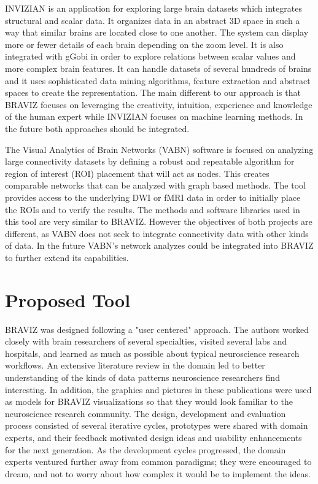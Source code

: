 \documentclass[utf8]{frontiersSCNS} %
\begin{document}
INVIZIAN\citep{bowman_query-based_2011,bowman_feature-similarity_2012} is an application for exploring large brain datasets which integrates structural and scalar data. It organizes data in an abstract 3D space in such a way that similar brains are located close to one another. The system can display more or fewer details of each brain depending on the zoom level. It is also integrated with gGobi\citep{cook_interactive_2007} in order to explore relations between scalar values and more complex brain features. It can handle datasets of several hundreds of brains and it uses sophisticated data mining algorithms, feature extraction and abstract spaces to create the representation. The main different to our approach is that BRAVIZ focuses on leveraging the creativity, intuition, experience and knowledge of the human expert while INVIZIAN focuses on machine learning methods. In the future both approaches should be integrated.

The Visual Analytics of Brain Networks\citep{li_visual_2012} (VABN) software is focused on analyzing large connectivity datasets by defining a robust and repeatable algorithm for region of interest (ROI) placement that will act as nodes. This creates comparable networks that can be analyzed with graph based methods. The tool provides access to the underlying DWI or fMRI data in order to initially place the ROIs and to verify the results. The methods and software libraries used in this tool are very similar to BRAVIZ. However the objectives of both projects are different, as VABN does not seek to integrate connectivity data with other kinds of data. In the future VABN’s network analyzes could be integrated into BRAVIZ to further extend its capabilities.

\section{Proposed Tool}

BRAVIZ was designed following a "user centered" approach\citep{fernandez_user-centered_2013,wassink_applying_2009}. The authors worked closely with brain researchers of several specialties, visited several labs and hospitals, and learned as much as possible about typical neuroscience research workflows. An extensive literature review in the domain led to better understanding of the kinds of data patterns neuroscience researchers find interesting. In addition, the graphics and pictures in these publications were used as models for BRAVIZ visualizations so that they would look familiar to the neuroscience research community. The design, development and evaluation process consisted of several iterative cycles, prototypes were shared with domain experts, and their feedback motivated design ideas and usability enhancements for the next generation. As the development cycles progressed, the domain experts ventured further away from common paradigms; they were encouraged to dream, and not to worry about how complex it would be to implement the ideas. 
\end{document}
